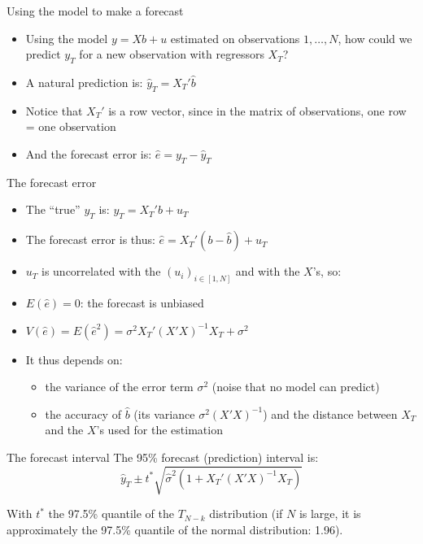 \documentclass[aspectratio=169]{beamer}
\begin{document}
\begin{frame}{Using the model to make a forecast}
\begin{itemize}
    \item Using the model $y = Xb + u$ estimated on observations $1, \dots, N$, how could we predict $y_T$ for a new observation with regressors $X_T$?
    \item A natural prediction is: $\hat{y}_T = X_T'\hat{b}$
    \item Notice that $X_T'$ is a row vector, since in the matrix of observations, one row = one observation
    \item And the forecast error is: $\hat{e} = y_T - \hat{y}_T$
\end{itemize}
\end{frame}

\begin{frame}{The forecast error}
\begin{itemize}
    \item The ``true'' $y_T$ is: $y_T = X_T'b + u_T$
    \item The forecast error is thus: $\hat{e} = X_T'(b - \hat{b}) + u_T$
    \item $u_T$ is uncorrelated with the $(u_i)_{i\in[1,N]}$ and with the $X$'s, so:
    \item $E(\hat{e}) = 0$: the forecast is unbiased
    \item $V(\hat{e}) = E(\hat{e}^2) = \sigma^2 X_T'(X'X)^{-1}X_T + \sigma^2$
    \item It thus depends on:
    \begin{itemize}
        \item the variance of the error term $\sigma^2$ (noise that no model can predict)
        \item the accuracy of $\hat{b}$ (its variance $\sigma^2(X'X)^{-1}$) and the distance between $X_T$ and the $X$'s used for the estimation
    \end{itemize}
\end{itemize}
\end{frame}

\begin{frame}{The forecast interval}
The 95\% forecast (prediction) interval is:
\[
\hat{y}_T \pm t^* \sqrt{\hat{\sigma}^2 \left(1 + X_T'(X'X)^{-1}X_T\right)}
\]

With $t^*$ the 97.5\% quantile of the $T_{N-k}$ distribution (if $N$ is large, it is approximately the 97.5\% quantile of the normal distribution: 1.96).
\end{frame}
\end{document}
